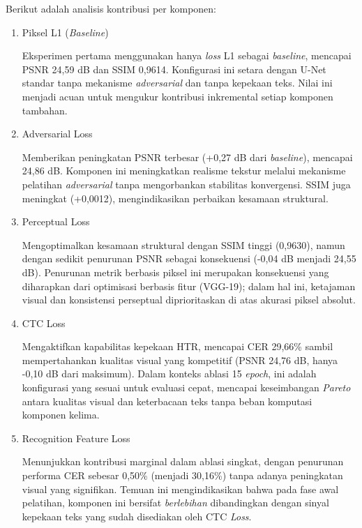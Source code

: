\documentclass[12pt,a4paper]{article}
\begin{document}
Berikut adalah analisis kontribusi per komponen:
\begin{enumerate}[leftmargin=1.5em, labelsep=0.5em, itemindent=0pt, label=\arabic*., leftmargin=0.8cm, topsep=0pt, partopsep=0pt]
\item Piksel L1 (\textit{Baseline})

Eksperimen pertama menggunakan hanya \textit{loss} L1 sebagai \textit{baseline}, mencapai PSNR 24,59 dB dan SSIM 0,9614. Konfigurasi ini setara dengan U-Net standar tanpa mekanisme \textit{adversarial} dan tanpa kepekaan teks. Nilai ini menjadi acuan untuk mengukur kontribusi inkremental setiap komponen tambahan.

\item Adversarial Loss

Memberikan peningkatan PSNR terbesar (+0,27 dB dari \textit{baseline}), mencapai 24,86 dB. Komponen ini meningkatkan realisme tekstur melalui mekanisme pelatihan \textit{adversarial} tanpa mengorbankan stabilitas konvergensi. SSIM juga meningkat (+0,0012), mengindikasikan perbaikan kesamaan struktural.

\item Perceptual Loss

Mengoptimalkan kesamaan struktural dengan SSIM tinggi (0,9630), namun dengan sedikit penurunan PSNR sebagai konsekuensi (-0,04 dB menjadi 24,55 dB). Penurunan metrik berbasis piksel ini merupakan konsekuensi yang diharapkan dari optimisasi berbasis fitur (VGG-19); dalam hal ini, ketajaman visual dan konsistensi perseptual diprioritaskan di atas akurasi piksel absolut.

\item CTC Loss

Mengaktifkan kapabilitas kepekaan HTR, mencapai CER 29,66\% sambil mempertahankan kualitas visual yang kompetitif (PSNR 24,76 dB, hanya -0,10 dB dari maksimum). Dalam konteks ablasi 15 \textit{epoch}, ini adalah konfigurasi yang sesuai untuk evaluasi cepat, mencapai keseimbangan \textit{Pareto} antara kualitas visual dan keterbacaan teks tanpa beban komputasi komponen kelima.

\item Recognition Feature Loss

Menunjukkan kontribusi marginal dalam ablasi singkat, dengan penurunan performa CER sebesar 0,50\% (menjadi 30,16\%) tanpa adanya peningkatan visual yang signifikan. Temuan ini mengindikasikan bahwa pada fase awal pelatihan, komponen ini bersifat \textit{berlebihan} dibandingkan dengan sinyal kepekaan teks yang sudah disediakan oleh CTC \textit{Loss}.

\end{enumerate}
\end{document}
